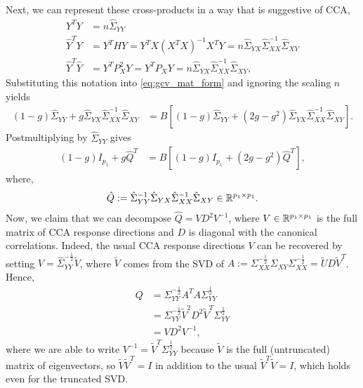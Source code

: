\documentclass{article}
\begin{document}
Next, we can represent these cross-products in a way that is suggestive of CCA,
\begin{align*}
  Y^{T}Y &= n \hat{\Sigma}_{YY} \\
  \hat{Y}^{T}Y &= Y^{T}HY = Y^{T}X\left(X^{T}X\right)^{-1}X^{T}Y =
  n\hat{\Sigma}_{YX}\hat{\Sigma}_{XX}^{-1} \hat{\Sigma}_{XY} \\
  \hat{Y}^{T}\hat{Y} &= Y^{T}P_{X}^2 Y = Y^{T}P_{X}Y=
  n\hat{\Sigma}_{YX}\hat{\Sigma}_{XX}^{-1} \hat{\Sigma}_{XY},
\end{align*}
Substituting this notation into \ref{eq:gcv_mat_form} and ignoring the scaling
$n$ yields
\begin{align*}
\left(1 - g\right)\hat{\Sigma}_{YY} + g
\hat{\Sigma}_{YX}\hat{\Sigma}_{XX}^{-1}\hat{\Sigma}_{XY} &=
B\left[\left(1 - g\right)\hat{\Sigma}_{YY} + \left(2g -
    g^{2}\right)\hat{\Sigma}_{YX}\hat{\Sigma}_{XX}^{-1}\hat{\Sigma}_{XY}\right].
\end{align*}
Postmultiplying by $\hat{\Sigma}_{YY}$ gives
\begin{align}
  \left(1 - g\right)I_{p_{1}} + g\hat{Q}^{T} &= B\left[\left(1 -
      g\right)I_{p_{1}} + \left(2g -
      g^{2}\right)\hat{Q}^{T}\right], \label{eq:cca_gcv_id}
\end{align}
where,
\begin{align*}
\hat{Q} :=
\hat{\Sigma}_{YY}^{-1}\hat{\Sigma}_{YX}\hat{\Sigma}_{XX}^{-1}\hat{\Sigma}_{XY}
\in \mathbb{R}^{p_{1}\times p_{1}}.
\end{align*}
Now, we claim that we can decompose $\hat{Q} = VD^{2}V^{-1}$, where $V \in
\mathbb{R}^{p_{1} \times p_{1}}$ is the full matrix of CCA response directions and
$D$ is diagonal with the canonical correlations. Indeed, the usual CCA response
directions $V$ can be recovered by setting $V =
\hat{\Sigma}_{YY}^{-\frac{1}{2}}\tilde{V}$, where $\tilde{V}$ comes from the SVD
of $A := \Sigma_{XX}^{-\frac{1}{2}}\Sigma_{XY}\Sigma_{XX}^{-\frac{1}{2}} =
\tilde{U}D\tilde{V}^{T}$. Hence,
\begin{align}
  Q &= \Sigma_{YY}^{-\frac{1}{2}}A^{T}A\Sigma_{YY}^{\frac{1}{2}} \\
  &= \Sigma_{YY}^{-\frac{1}{2}}\tilde{V}^{2}D^{2}\tilde{V}^{T}\Sigma_{YY}^{\frac{1}{2}}\\
  &= VD^{2}V^{-1},
\end{align}
where we are able to write $V^{-1} = \tilde{V}^{T}\Sigma_{YY}^{\frac{1}{2}}$
because $\tilde{V}$ is the full (untruncated) matrix of eigenvectors, so
$\tilde{V}\tilde{V}^{T} = I$ in addition to the usual $\tilde{V}^{T}\tilde{V}
=I$, which holds even for the truncated SVD.
\end{document}
